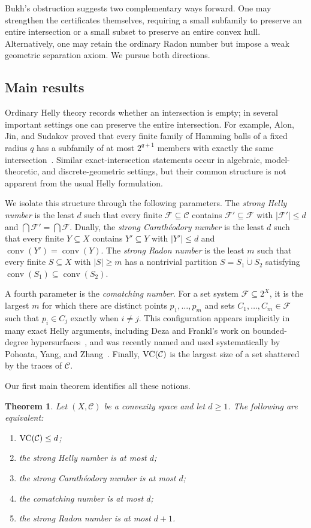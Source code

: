 \documentclass[11pt]{article}
\newtheorem{thm}{Theorem}[section]%
\theoremstyle{definition}
\newcommand{\F}{\mathcal{F}}
\newcommand{\C}{\mathcal{C}}
\newcommand{\conv}{\operatorname{conv}}
\newcommand{\VC}{\textup{VC}}
\begin{document}
Bukh's obstruction suggests two complementary ways forward. One may strengthen the certificates themselves, requiring a small subfamily to preserve an entire intersection or a small subset to preserve an entire convex hull. Alternatively, one may retain the ordinary Radon number but impose a weak geometric separation axiom. We pursue both directions.

\subsection{Main results}\label{subsec:intro:contributions}
Ordinary Helly theory records whether an intersection is empty; in several important settings one can preserve the entire intersection. For example, Alon, Jin, and Sudakov proved that every finite family of Hamming balls of a fixed radius $q$ has a subfamily of at most $2^{q+1}$ members with exactly the same intersection~\cite{alon2024helly}. Similar exact-intersection statements occur in algebraic, model-theoretic, and discrete-geometric settings, but their common structure is not apparent from the usual Helly formulation.

We isolate this structure through the following parameters. The \emph{strong Helly number} is the least $d$ such that every finite $\F\subseteq\C$ contains $\F'\subseteq\F$ with $|\F'|\le d$ and $\bigcap\F'=\bigcap\F$. Dually, the \emph{strong Carath\'eodory number} is the least $d$ such that every finite $Y\subseteq X$ contains $Y'\subseteq Y$ with $|Y'|\le d$ and $\conv(Y')=\conv(Y)$. The \emph{strong Radon number} is the least $m$ such that every finite $S\subseteq X$ with $|S|\ge m$ has a nontrivial partition $S=S_1\mathbin{\dot\cup}S_2$ satisfying $\conv(S_1)\subseteq\conv(S_2)$.

A fourth parameter is the \emph{comatching number}. For a set system $\F\subseteq2^X$, it is the largest $m$ for which there are distinct points $p_1,\ldots,p_m$ and sets $C_1,\ldots,C_m\in\F$ such that $p_i\in C_j$ exactly when $i\ne j$. This configuration appears implicitly in many exact Helly arguments, including Deza and Frankl's work on bounded-degree hypersurfaces~\cite{deza1987helly}, and was recently named and used systematically by Pohoata, Yang, and Zhang~\cite{pohoata2025colorful}. Finally, $\VC(\C)$ is the largest size of a set shattered by the traces of $\C$.

Our first main theorem identifies all these notions.

\begin{thm}\label{thm:main:short}
Let $(X,\C)$ be a convexity space and let $d\ge1$. The following are equivalent:
\begin{enumerate}
    \item $\VC(\C)\le d$;
    \item the strong Helly number is at most $d$;
    \item the strong Carath\'eodory number is at most $d$;
    \item the comatching number is at most $d$;
    \item the strong Radon number is at most $d+1$.
\end{enumerate}
\end{thm}
\end{document}
